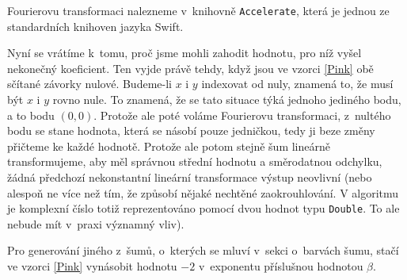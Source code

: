 Fourierovu transformaci nalezneme v~knihovně {\tt Accelerate}, která je jednou ze
standardních knihoven jazyka Swift.

Nyní se vrátíme k~tomu, proč jsme mohli zahodit hodnotu, pro níž vyšel
nekonečný koeficient. Ten vyjde právě tehdy, když jsou ve vzorci \eqref{Pink}
obě sčítané závorky nulové. Budeme-li $x$ i $y$ indexovat od nuly, znamená to,
že musí být $x$ i $y$ rovno nule. To znamená, že se tato situace týká jednoho
jediného bodu, a to bodu $(0,0)$. Protože ale poté voláme Fourierovu
transformaci, z~nultého bodu se stane hodnota, která se násobí pouze jedničkou,
tedy ji beze změny přičteme ke každé hodnotě. Protože ale potom stejně šum
lineárně transformujeme, aby měl správnou střední hodnotu a směrodatnou
odchylku, žádná předchozí nekonstantní lineární transformace výstup neovlivní
(nebo alespoň ne více než tím, že způsobí nějaké nechtěné
zaokrouhlování. V algoritmu je komplexní číslo totiž reprezentováno pomocí
dvou hodnot typu {\tt Double}. To ale nebude mít v~praxi významný vliv).

Pro generování jiného z~šumů, o~kterých se mluví v~sekci o~barvách šumu, stačí 
ve vzorci \eqref{Pink} vynásobit hodnotu $-2$ v~exponentu příslušnou hodnotou $\beta$.
